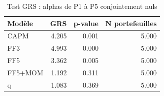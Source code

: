 \begin{table}[htbp]
\centering
\small
\caption{Test GRS : alphas de P1 à P5 conjointement nuls}
\label{tab:T6c_GRS}
\begin{tabular}{lrrr}
\toprule
Modèle & GRS & p-value & N portefeuilles \\
\midrule
CAPM & 4.205 & 0.001 & 5.000 \\
FF3 & 4.993 & 0.000 & 5.000 \\
FF5 & 3.362 & 0.005 & 5.000 \\
FF5+MOM & 1.192 & 0.311 & 5.000 \\
q & 1.083 & 0.369 & 5.000 \\
\bottomrule
\end{tabular}
\end{table}